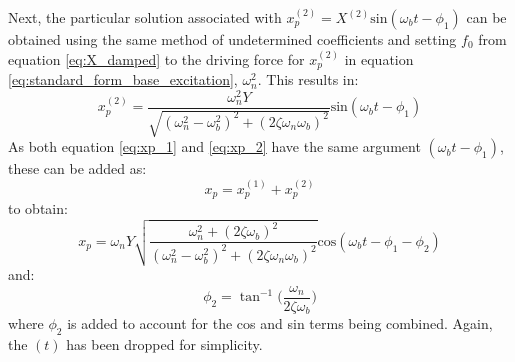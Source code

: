 \documentclass[12pt,letter]{article}
\begin{document}
		Next, the particular solution associated with $x_p^{(2)} = X^{(2)} \text{sin}(\omega_b t - \phi_1)$ can be obtained using the same method of undetermined coefficients and setting $f_0$ from equation \ref{eq:X_damped} to the driving force for $x_p^{(2)}$ in equation  \ref{eq:standard_form_base_excitation}, $\omega_n^2$. This results in:
		\begin{equation}
			x_p^{(2)} = \frac{\omega_n^2 Y}{\sqrt{(\omega_n^2 - \omega_b^2)^2 +  (2\zeta \omega_n \omega_b)^2}}  \text{sin}(\omega_b t - \phi_1)
			\label{eq:xp_2}
		\end{equation}
		As both equation \ref{eq:xp_1} and \ref{eq:xp_2}  have the same argument $(\omega_b t - \phi_1)$, these can be added as:
		\begin{equation}
			x_p = 	x_p^{(1)} + x_p^{(2)}
		\end{equation}
		to obtain:
		\begin{equation}
			x_p = 	\omega_n Y   \sqrt{\frac{\omega_n^2 + (2 \zeta \omega_b)^2 }{(\omega_n^2 - \omega_b^2)^2 +  (2\zeta \omega_n \omega_b)^2} }  \text{cos}(\omega_bt - \phi_1 - \phi_2)
		\end{equation}
		and:
		\begin{equation}
			\phi_2 = \tan^{-1} \bigg(\frac{\omega_n}{2\zeta \omega_b}\bigg)
		\end{equation}
		where $\phi_2$ is added to account for the cos and sin terms being combined. Again, the $(t)$ has been dropped for simplicity. 
		
\end{document}

